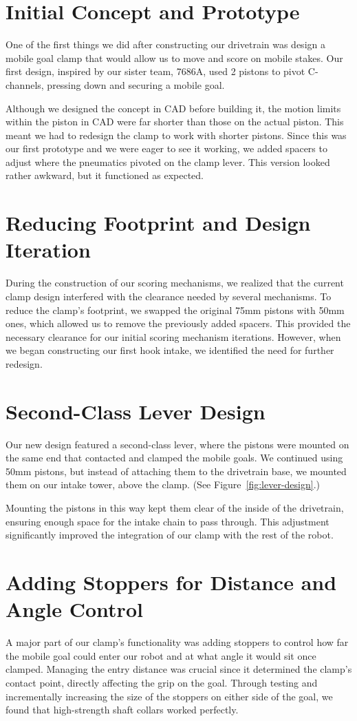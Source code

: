 \section*{Initial Concept and Prototype}
One of the first things we did after constructing our drivetrain was design a mobile goal clamp that would allow us to move and score on mobile stakes. Our first design, inspired by our sister team, 7686A, used 2 pistons to pivot C-channels, pressing down and securing a mobile goal. 

Although we designed the concept in CAD before building it, the motion limits within the piston in CAD were far shorter than those on the actual piston. This meant we had to redesign the clamp to work with shorter pistons. Since this was our first prototype and we were eager to see it working, we added spacers to adjust where the pneumatics pivoted on the clamp lever. This version looked rather awkward, but it functioned as expected.

\section*{Reducing Footprint and Design Iteration}
During the construction of our scoring mechanisms, we realized that the current clamp design interfered with the clearance needed by several mechanisms. To reduce the clamp’s footprint, we swapped the original 75mm pistons with 50mm ones, which allowed us to remove the previously added spacers. This provided the necessary clearance for our initial scoring mechanism iterations. However, when we began constructing our first hook intake, we identified the need for further redesign.

\section*{Second-Class Lever Design}
Our new design featured a second-class lever, where the pistons were mounted on the same end that contacted and clamped the mobile goals. We continued using 50mm pistons, but instead of attaching them to the drivetrain base, we mounted them on our intake tower, above the clamp. (See Figure~\ref{fig:lever-design}.) 

Mounting the pistons in this way kept them clear of the inside of the drivetrain, ensuring enough space for the intake chain to pass through. This adjustment significantly improved the integration of our clamp with the rest of the robot.

\section*{Adding Stoppers for Distance and Angle Control}
A major part of our clamp’s functionality was adding stoppers to control how far the mobile goal could enter our robot and at what angle it would sit once clamped. Managing the entry distance was crucial since it determined the clamp’s contact point, directly affecting the grip on the goal. Through testing and incrementally increasing the size of the stoppers on either side of the goal, we found that high-strength shaft collars worked perfectly.

